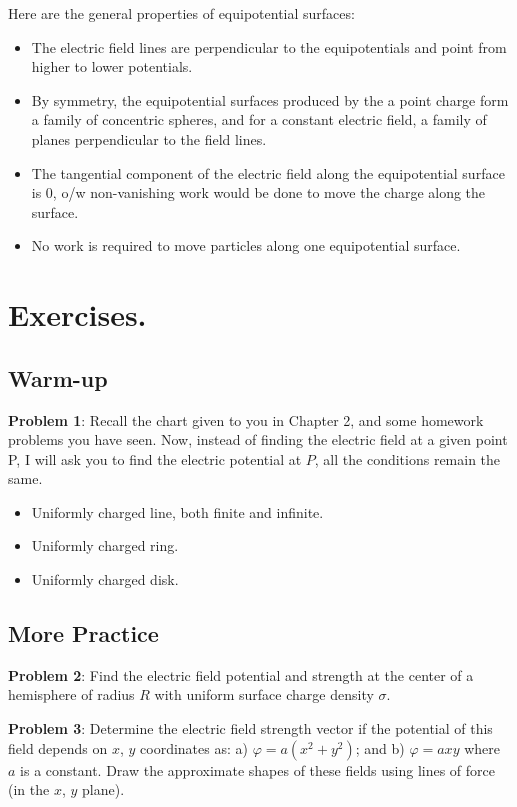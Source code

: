 \documentclass[11pt, letterpaper]{article}
\begin{document}
	Here are the general properties of equipotential surfaces:
	\begin{itemize}
		\item The electric field lines are perpendicular to the equipotentials and point from higher
		to lower potentials.
		\item By symmetry, the equipotential surfaces produced by the a point charge form a family
		of concentric spheres, and for a constant electric field, a family of planes perpendicular to 
		the field lines.
		\item The tangential component of the electric field along the equipotential surface is 0, o/w
		non-vanishing work would be done to move the charge along the surface.
		\item No work is required to move particles along one equipotential surface.
	\end{itemize}

\section{Exercises.}
\subsection{Warm-up}

	\textbf{Problem 1}: Recall the chart given to you in Chapter 2, and some homework problems 
	you have seen. Now, instead of finding the electric field at a given point P, I will ask you to find
	the electric potential at $P$, all the conditions remain the same.
	\begin{itemize}
		\item Uniformly charged line, both finite and infinite.
		\item Uniformly charged ring.
		\item Uniformly charged disk.
	\end{itemize}
	
\subsection{More Practice}
	\textbf{Problem 2}: Find the electric field potential and strength at the center of a hemisphere
	of radius $R$ with uniform surface charge density $\sigma$.
	
	\textbf{Problem 3}: Determine the electric field strength vector if the potential of this field 
	depends on $x$, $y$ coordinates as: a) $\varphi = a(x^2+y^2)$; and b) $\varphi = axy$ where
	$a$ is a constant. Draw the approximate shapes of these fields using lines of force (in the $x$,
	$y$ plane).
	
\end{document}
